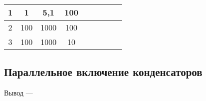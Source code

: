 \begin{table}[h]
\begin{tabular}{|c|cc|c|c|cc|cc|}
1                  & \multicolumn{1}{c|}{1}          & 5,1        & 100                                &                                               & \multicolumn{1}{c|}{}                                                                 &                                                                    & \multicolumn{1}{c|}{}                                                                &                                                                     \\ \hline
2                  & \multicolumn{1}{c|}{100}        & 1000       & 100                             &                                                  & \multicolumn{1}{c|}{}                                                                 &                                                                    & \multicolumn{1}{c|}{}                                                                &                                                                     \\ \hline
3                  & \multicolumn{1}{c|}{100}        & 1000       & 10                                      &                                          & \multicolumn{1}{c|}{}                                                                 &                                                                    & \multicolumn{1}{c|}{}                                                                &                                                                     \\ \hline
\end{tabular}
\end{table}
\subsection{Параллельное включение конденсаторов}

Вывод --- \hrulefill

\hrulefill

\hrulefill

